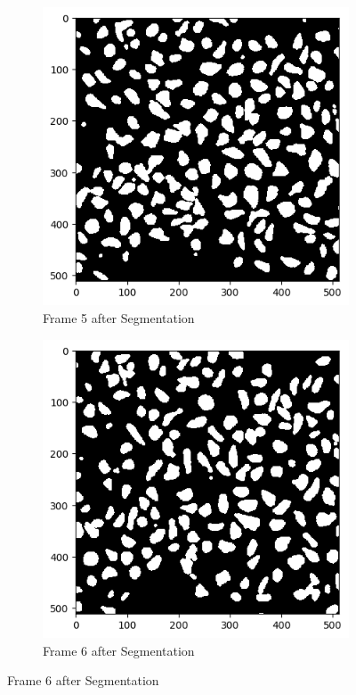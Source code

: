 \documentclass{article}
\begin{document}
\begin{figure}[h!]
  \begin{subfigure}{0.4\textwidth}
    \includegraphics[width=\linewidth]{Report/Appendix_Images/Segmentation-B-Growth/frame_5.png}
    \caption*{Frame 5 after Segmentation}
  \end{subfigure}
  \hfill
  \begin{subfigure}{0.4\textwidth}
    \includegraphics[width=\linewidth]{Report/Appendix_Images/Segmentation-B-Growth/frame_6.png}
    \caption*{Frame 6 after Segmentation}
  \end{subfigure}
\end{figure}
\end{document}
